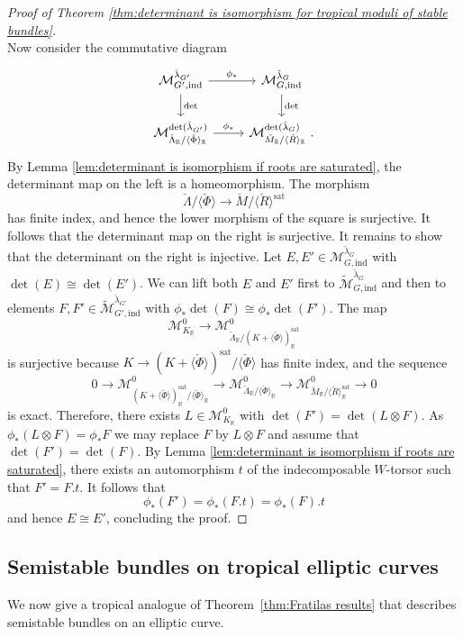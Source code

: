 \documentclass[10pt, a4paper]{amsart}
\theoremstyle{definition}
\theoremstyle{myitemstyle}
\newcommand{\R}{\mathbb{R}}
\newcommand{\RR}{\mathbb{R}}
\newcommand{\Mcheck}{{\check{M}}}
\newcommand{\Lambdacheck}{\check{\Lambda}}
\newcommand{\lambdacheck}{\check{\lambda}}
\newcommand{\Rcheck}{\check{R}}
\newcommand{\Phicheck}{\check{\Phi}}
\newcommand{\mc}[1]{{\mathcal{#1}}}
\newcommand{\wmc}[1]{{\widetilde{\mathcal{#1}}}}
\newcommand{\sat}{\mathrm{sat}}
\newcommand{\ind}{\mathrm{ind}}
\begin{document}
\begin{proof}[Proof of Theorem \ref{thm:determinant is isomorphism for tropical moduli of stable bundles}]
\[\]
Now consider the commutative diagram
\[
\begin{tikzcd}
    \mc M^{\lambdacheck_{G'}}_{G',\ind} \arrow[r,"\phi_*"] \arrow[d,"\det"]&
        \mc M^{\lambdacheck_G}_{G,\ind} \arrow[d,"\det"]\\
    \mc M^{\det(\lambdacheck_{G'})}_{\Lambdacheck_\RR/\langle\Phicheck\rangle_\RR} \arrow[r,"\phi_*"] &
        \mc M^{\det(\lambdacheck_G)}_{\Mcheck_\RR/\langle\Rcheck\rangle_\RR} \ .
\end{tikzcd}
\]
By Lemma \ref{lem:determinant is isomorphism if roots are saturated}, the determinant map on the left is a homeomorphism. The morphism 
\[
\Lambdacheck/\langle\Phicheck\rangle\longrightarrow \Mcheck/\langle\Rcheck\rangle^\sat
\]
has finite index, and hence the lower morphism of the square is surjective. It follows that the determinant map on the right is surjective. It remains to show that the determinant on the right is injective. Let $E,E'\in \mc M^{\lambdacheck_G}_{G,\ind}$ with $\det(E)\cong\det(E')$. We can lift both $E$ and $E'$ first to $\wmc M^{\lambdacheck_G}_{G,\ind}$ and then to elements $F,F'\in \wmc M^{\lambdacheck_{G'}}_{G',\ind}$ with $\phi_*\det(F)\cong \phi_*\det(F')$. The map
\[
    \mc M_{K_\R}^0 \longrightarrow 
        \mc M^0_{\Lambdacheck_\R/(K+\langle\Phicheck\rangle)^\sat_\R} 
\]
is surjective because $K\to (K+\langle\Phicheck\rangle)^\sat/\langle\Phicheck\rangle$ has finite index, and the sequence 
\[
    0 \longrightarrow
        \mc M^0_{(K+\langle\Phicheck\rangle)^\sat_\R/\langle\Phicheck \rangle_\R} \longrightarrow  
            \mc M^0_{\Lambdacheck_\R/\langle\Phicheck\rangle_\R} \longrightarrow
                \mc M^0_{\Mcheck_\R/\langle\Rcheck\rangle^\sat_\R}\longrightarrow   
                    0
\]
is exact. Therefore, there exists $L\in \mc M^0_{K_\R}$ with $\det(F')=\det(L \otimes F)$. As $\phi_*(L\otimes F)=\phi_*F$ we may replace $F$ by $L\otimes F$ and assume that $\det(F')=\det(F)$.
By Lemma \ref{lem:determinant is isomorphism if roots are saturated}, there exists an automorphism $t$ of the indecomposable $W$-torsor such that $F'=F.t$. It follows that 
\[
    \phi_*(F')=\phi_*(F.t) =\phi_*(F).t
\]
and hence $E\cong E'$, concluding the proof.
\end{proof}


\subsection{Semistable bundles on tropical elliptic curves}

We now give a tropical analogue of Theorem~\ref{thm:Fratilas results} that describes semistable bundles on an elliptic curve. 
\end{document}
